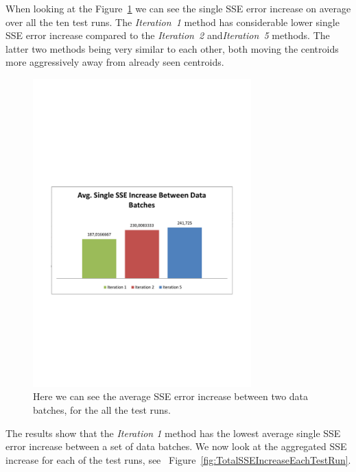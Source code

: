 When looking at the Figure~\ref{fig:results_AvgIncreaseBetweenDataBatches} we can see the single SSE error increase on average over all the ten test runs. The \textit{Iteration~1} method has considerable lower single SSE error increase compared to the \textit{Iteration~2} and\textit{Iteration~5} methods. The latter two methods being very similar to each other, both moving the centroids more aggressively away from already seen centroids.


\begin{figure}[ht]
\centering
\includegraphics[trim = 10mm 90mm 10mm 100mm, clip, width=0.75\textwidth]{Figures/experiments/zdataWO_AvgSingleSSEIncreaseBetweenDataBatches.pdf}
\caption{Here we can see the average SSE error increase between two data batches, for the all the test runs. }
\label{fig:results_AvgIncreaseBetweenDataBatches}
\end{figure}

The results show that the \textit{Iteration 1} method has the lowest average single SSE error increase between a set of data batches. We now look at the aggregated SSE increase for each of the test runs, see ~Figure~\ref{fig:TotalSSEIncreaseEachTestRun}. 

